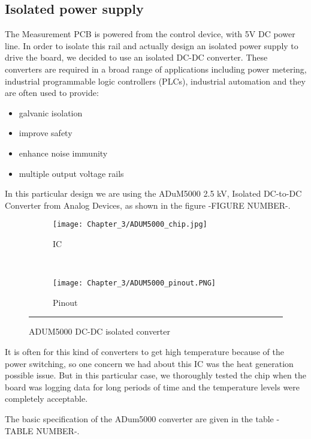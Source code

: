 \subsection{Isolated power supply}
The Measurement PCB is powered from the control device, with 5V DC power line. In order to isolate this rail and actually design an isolated power supply to drive the board, we decided to use an isolated DC-DC converter. These converters are required in a broad range of applications including power metering, industrial programmable logic controllers (PLCs), industrial automation and they are often used to provide:

\begin{itemize}
    \item galvanic isolation
    \item improve safety
    \item enhance noise immunity
    \item multiple output voltage rails
\end{itemize}

In this particular design we are using the ADuM5000 2.5 kV, Isolated DC-to-DC Converter from Analog Devices, as shown in the figure -FIGURE NUMBER-.\\

\begin{figure}[htbp]
	\centering
	\begin{subfigure}[b]{.4\textwidth}
		\texttt{[image: Chapter\_3/ADUM5000\_chip.jpg]}
	    \caption[]{IC}
	    \label{fig:ADUM5000_chip}
	\end{subfigure}
    ~
	\begin{subfigure}[b]{.3\textwidth}
		\texttt{[image: Chapter\_3/ADUM5000\_pinout.PNG]}
	    \caption[]{Pinout}
	    \label{fig:ADUM5000_pinout}
	\end{subfigure}
	\rule{35em}{0.5pt}
	\caption{ADUM5000 DC-DC isolated converter}
	\label{fig:ADUM5000}
\end{figure}

It is often for this kind of converters to get high temperature because of the power switching, so one concern we had about this IC was the heat generation possible issue. But in this particular case, we thoroughly tested the chip when the board was logging data for long periods of time and the temperature levels were completely acceptable.

The basic specification of the ADum5000 converter are given in the table -TABLE NUMBER-.\\

